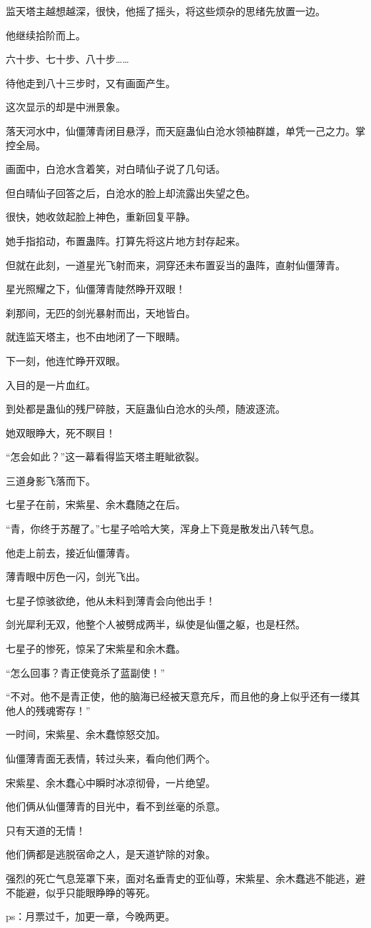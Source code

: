 \begin{this_body}
监天塔主越想越深，很快，他摇了摇头，将这些烦杂的思绪先放置一边。

他继续拾阶而上。

六十步、七十步、八十步……

待他走到八十三步时，又有画面产生。

这次显示的却是中洲景象。

落天河水中，仙僵薄青闭目悬浮，而天庭蛊仙白沧水领袖群雄，单凭一己之力。掌控全局。

画面中，白沧水含着笑，对白晴仙子说了几句话。

但白晴仙子回答之后，白沧水的脸上却流露出失望之色。

很快，她收敛起脸上神色，重新回复平静。

她手指掐动，布置蛊阵。打算先将这片地方封存起来。

但就在此刻，一道星光飞射而来，洞穿还未布置妥当的蛊阵，直射仙僵薄青。

星光照耀之下，仙僵薄青陡然睁开双眼！

刹那间，无匹的剑光暴射而出，天地皆白。

就连监天塔主，也不由地闭了一下眼睛。

下一刻，他连忙睁开双眼。

入目的是一片血红。

到处都是蛊仙的残尸碎肢，天庭蛊仙白沧水的头颅，随波逐流。

她双眼睁大，死不瞑目！

“怎会如此？”这一幕看得监天塔主睚眦欲裂。

三道身影飞落而下。

七星子在前，宋紫星、余木蠢随之在后。

“青，你终于苏醒了。”七星子哈哈大笑，浑身上下竟是散发出八转气息。

他走上前去，接近仙僵薄青。

薄青眼中厉色一闪，剑光飞出。

七星子惊骇欲绝，他从未料到薄青会向他出手！

剑光犀利无双，他整个人被劈成两半，纵使是仙僵之躯，也是枉然。

七星子的惨死，惊呆了宋紫星和余木蠢。

“怎么回事？青正使竟杀了蓝副使！”

“不对。他不是青正使，他的脑海已经被天意充斥，而且他的身上似乎还有一缕其他人的残魂寄存！”

一时间，宋紫星、余木蠢惊怒交加。

仙僵薄青面无表情，转过头来，看向他们两个。

宋紫星、余木蠢心中瞬时冰凉彻骨，一片绝望。

他们俩从仙僵薄青的目光中，看不到丝毫的杀意。

只有天道的无情！

他们俩都是逃脱宿命之人，是天道铲除的对象。

强烈的死亡气息笼罩下来，面对名垂青史的亚仙尊，宋紫星、余木蠢逃不能逃，避不能避，似乎只能眼睁睁的等死。

ps：月票过千，加更一章，今晚两更。

\end{this_body}

